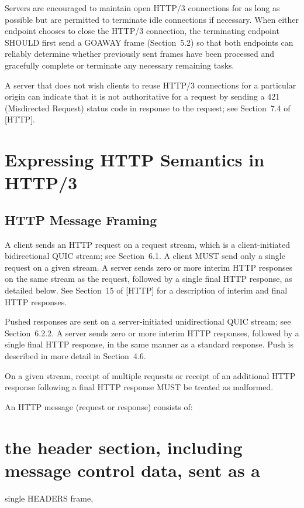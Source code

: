 \documentclass{article}
\begin{document}
Servers are encouraged to maintain open HTTP/3 connections for as long as possible but are permitted to terminate idle connections if necessary.  When either endpoint chooses to close the HTTP/3 connection, the terminating endpoint SHOULD first send a GOAWAY frame (Section~5.2) so that both endpoints can reliably determine whether previously sent frames have been processed and gracefully complete or terminate any necessary remaining tasks.

A server that does not wish clients to reuse HTTP/3 connections for a particular origin can indicate that it is not authoritative for a request by sending a 421 (Misdirected Request) status code in response to the request; see Section~7.4 of [HTTP].

\section{Expressing HTTP Semantics in HTTP/3}

\subsection{HTTP Message Framing}

A client sends an HTTP request on a request stream, which is a client-initiated bidirectional QUIC stream; see Section~6.1.  A client MUST send only a single request on a given stream.  A server sends zero or more interim HTTP responses on the same stream as the request, followed by a single final HTTP response, as detailed below. See Section~15 of [HTTP] for a description of interim and final HTTP responses.

Pushed responses are sent on a server-initiated unidirectional QUIC stream; see Section~6.2.2.  A server sends zero or more interim HTTP responses, followed by a single final HTTP response, in the same manner as a standard response.  Push is described in more detail in Section~4.6.

On a given stream, receipt of multiple requests or receipt of an additional HTTP response following a final HTTP response MUST be treated as malformed.

An HTTP message (request or response) consists of:

\section{the header section, including message control data, sent as a}

single HEADERS frame,
\end{document}
